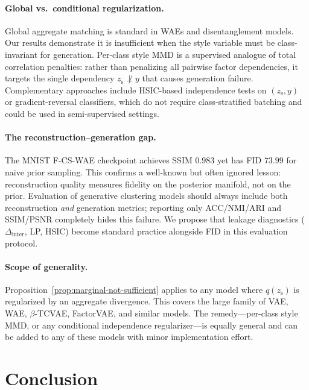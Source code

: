 \documentclass[10pt]{article}
\newcommand{\ours}{F-CS-WAE}
\newcommand{\zs}{z_{\mathrm{s}}}
\begin{document}
\paragraph{Global vs.\ conditional regularization.}
Global aggregate matching is standard in WAEs and disentanglement models.
Our results demonstrate it is insufficient when the style variable must be
class-invariant for generation.
Per-class style MMD is a supervised analogue of total correlation penalties:
rather than penalizing all pairwise factor dependencies, it targets the single
dependency $\zs\not\perp y$ that causes generation failure.
Complementary approaches include HSIC-based independence tests on $(\zs, y)$ or
gradient-reversal classifiers, which do not require class-stratified batching and
could be used in semi-supervised settings.

\paragraph{The reconstruction--generation gap.}
The MNIST \ours{} checkpoint achieves SSIM $0.983$ yet has FID $73.99$ for naive
prior sampling.
This confirms a well-known but often ignored lesson: reconstruction quality measures
fidelity on the posterior manifold, not on the prior.
Evaluation of generative clustering models should always include both reconstruction
\emph{and} generation metrics; reporting only ACC/NMI/ARI and SSIM/PSNR completely
hides this failure.
We propose that leakage diagnostics ($\Delta_{\mathrm{inter}}$, LP, HSIC) become
standard practice alongside FID in this evaluation protocol.

\paragraph{Scope of generality.}
Proposition~\ref{prop:marginal-not-sufficient} applies to any model where
$q(\zs)$ is regularized by an aggregate divergence.
This covers the large family of VAE, WAE, $\beta$-TCVAE, FactorVAE, and similar
models.
The remedy---per-class style MMD, or any conditional independence regularizer---is
equally general and can be added to any of these models with minor implementation
effort.

\section{Conclusion}
\end{document}
